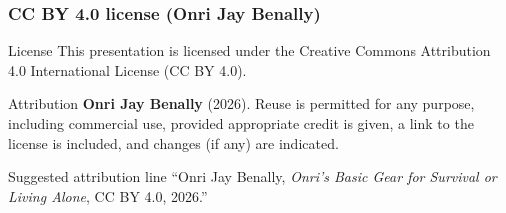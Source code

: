 \begin{frame}[t]
  \frametitle{CC BY 4.0 license (Onri Jay Benally)}
  \justifying
  \begin{block}{License}
    This presentation is licensed under the Creative Commons Attribution 4.0 International License (CC BY 4.0).~\cite{ccby4}
  \end{block}

  \begin{block}{Attribution}
    \textbf{Onri Jay Benally} (2026). Reuse is permitted for any purpose, including commercial use, provided appropriate credit is given, a link to the license is included, and changes (if any) are indicated.
  \end{block}

  \begin{block}{Suggested attribution line}
    ``Onri Jay Benally, \emph{Onri's Basic Gear for Survival or Living Alone}, CC BY 4.0, 2026.''
  \end{block}
\end{frame}


